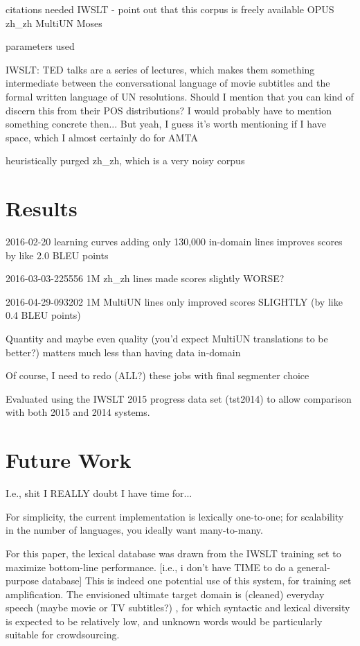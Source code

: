 citations needed
IWSLT - point out that this corpus is freely available
OPUS zh\_zh
MultiUN
Moses

parameters used

IWSLT: TED talks are a series of lectures, which makes them something intermediate between the conversational language of movie subtitles and the formal written language of UN resolutions.
Should I mention that you can kind of discern this from their POS distributions? I would probably have to mention something concrete then... But yeah, I guess it's worth mentioning if I have space, which I almost certainly do for AMTA

heuristically purged zh\_zh, which is a very noisy corpus

\section{Results}

2016-02-20 learning curves adding only 130,000 in-domain lines improves scores by like 2.0 BLEU points

2016-03-03-225556 1M zh\_zh lines made scores slightly WORSE?

2016-04-29-093202 1M MultiUN lines only improved scores SLIGHTLY (by like 0.4 BLEU points)

Quantity and maybe even quality (you'd expect MultiUN translations to be better?) matters much less than having data in-domain

Of course, I need to redo (ALL?) these jobs with final segmenter choice

Evaluated using the IWSLT 2015 progress data set (tst2014) to allow comparison with both 2015 and 2014 systems.


\section{Future Work}

I.e., shit I REALLY doubt I have time for...

For simplicity, the current implementation is lexically one-to-one; for scalability in the number of languages, you ideally want many-to-many.

For this paper, the lexical database was drawn from the IWSLT training set to maximize bottom-line performance.
[i.e., i don't have TIME to do a general-purpose database]
This is indeed one potential use of this system, for training set amplification.
The envisioned ultimate target domain is (cleaned) everyday speech (maybe movie or TV subtitles?) , for which syntactic and lexical diversity is expected to be relatively low, and unknown words would be particularly suitable for crowdsourcing.

